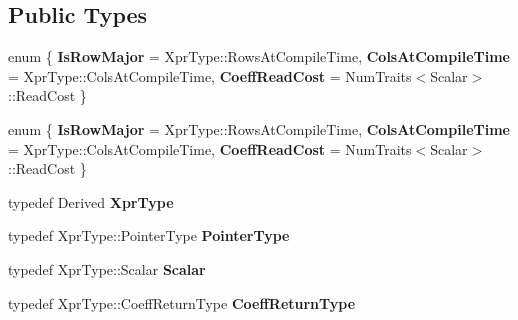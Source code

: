 \subsection*{Public Types}
\begin{DoxyCompactItemize}
\item 
\mbox{\label{struct_eigen_1_1internal_1_1mapbase__evaluator_a48936df443cdd4aeee271577c389dbc3}} 
enum \{ {\bfseries Is\+Row\+Major} = Xpr\+Type\+:\+:Rows\+At\+Compile\+Time, 
{\bfseries Cols\+At\+Compile\+Time} = Xpr\+Type\+:\+:Cols\+At\+Compile\+Time, 
{\bfseries Coeff\+Read\+Cost} = Num\+Traits$<$Scalar$>$\+:\+:Read\+Cost
 \}
\item 
\mbox{\label{struct_eigen_1_1internal_1_1mapbase__evaluator_a1b3fd61a30176b4f7bd50b681e47d5f6}} 
enum \{ {\bfseries Is\+Row\+Major} = Xpr\+Type\+:\+:Rows\+At\+Compile\+Time, 
{\bfseries Cols\+At\+Compile\+Time} = Xpr\+Type\+:\+:Cols\+At\+Compile\+Time, 
{\bfseries Coeff\+Read\+Cost} = Num\+Traits$<$Scalar$>$\+:\+:Read\+Cost
 \}
\item 
\mbox{\label{struct_eigen_1_1internal_1_1mapbase__evaluator_afba84e56a1b0084898f7558ab110837c}} 
typedef Derived {\bfseries Xpr\+Type}
\item 
\mbox{\label{struct_eigen_1_1internal_1_1mapbase__evaluator_a70ec31b534c7d98abad460b037be78a4}} 
typedef Xpr\+Type\+::\+Pointer\+Type {\bfseries Pointer\+Type}
\item 
\mbox{\label{struct_eigen_1_1internal_1_1mapbase__evaluator_a6ed4dac31c67f289147e3136e51f4284}} 
typedef Xpr\+Type\+::\+Scalar {\bfseries Scalar}
\item 
\mbox{\label{struct_eigen_1_1internal_1_1mapbase__evaluator_a8ecbb62e5ec7872f86b2a1ea087358ca}} 
typedef Xpr\+Type\+::\+Coeff\+Return\+Type {\bfseries Coeff\+Return\+Type}
\item 
\mbox{\label{struct_eigen_1_1internal_1_1mapbase__evaluator_afba84e56a1b0084898f7558ab110837c}} 

\end{DoxyCompactItemize}
